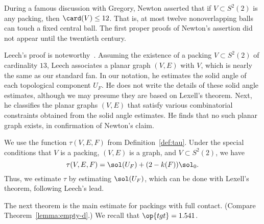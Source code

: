 \begin{remark}
During a famous discussion with Gregory, Newton asserted that 
if $V\subset S^2(2)$ is any packing, then $\card(V)\le 12$. That is, at most
twelve nonoverlapping balls can touch a fixed central ball.  The first proper
proofs of Newton's assertion did not appear until the twentieth century.
%
%
%
%
  
 Leech's proof is
noteworthy~\cite{Leech:1956:MG}.  Assuming the existence of a packing
$V\subset S^2(2)$ of cardinality $13$, Leech associates a planar graph
$(V,E)$ with $V$, which is nearly the same as our standard fan.  In
our notation, he estimates the solid angle of each topological
component $U_F$.  He does not write the details of these solid angle
estimates, although we may presume they are based on Lexell's theorem.
Next, he classifies the planar graphs $(V,E)$ that satisfy various
combinatorial constraints obtained from the solid angle estimates. He
finds that no such planar graph exists, in confirmation of Newton's
claim.
\end{remark}

We use the function $\tau(V,E,F)$ from Definition~\ref{def:tau}.  Under the 
special conditions that 
$V$ is a packing, $(V,E)$ is a  graph, and
$V\subset S^2(2)$, we have 
\[
\tau(V,E,F) = \sol(U_F) + (2-k(F)) \sol_0.
\]
Thus, we estimate $\tau$ by estimating $\sol(U_F)$, which can be done
 with Lexell's theorem, following Leech's lead.



The next theorem is the main estimate for packings with full contact.
(Compare  Theorem~\ref{lemma:empty-d}.)  
We recall that $\op{tgt}=1.541$.
%
%


